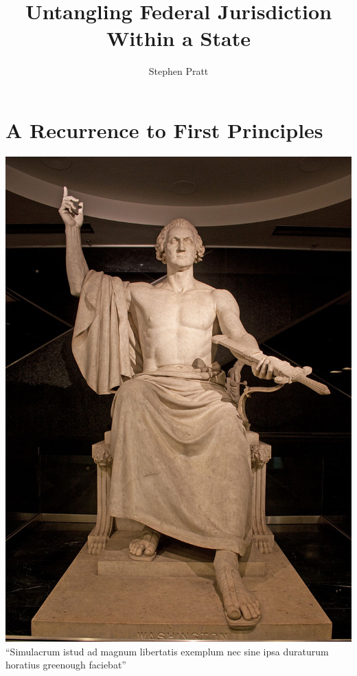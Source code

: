 


\usepackage[utf8]{inputenc}
\def\braces#1{[#1]}


\title[Untangling Federal Jurisdiction]{Untangling Federal Jurisdiction Within a State}
\author{Stephen Pratt}

\section{A Recurrence to First Principles}

\begin{frame}
    \centering
    \includegraphics[height=.85\textheight]{img/washington-greenough-face.jpg} \\
    ``Simulacrum istud ad magnum libertatis exemplum nec sine ipsa duraturum
    horatius greenough faciebat'' \\
\end{frame}

